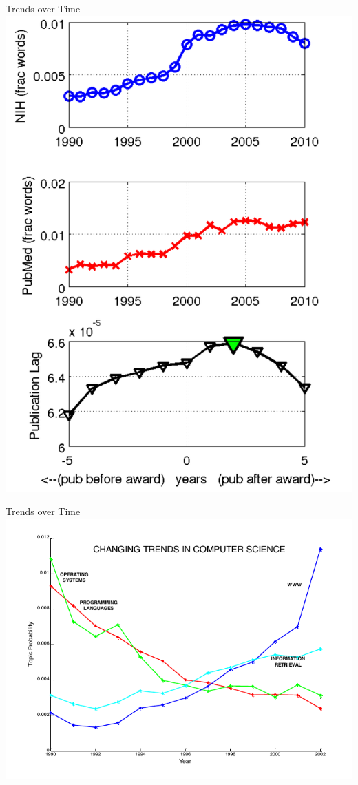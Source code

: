 \begin{frame}{Trends over Time}
  \centering
  \includegraphics[width=.5\linewidth]{topic_models/publication_lag}
\end{frame}

\begin{frame}{Trends over Time}
  \includegraphics[width=1.0\linewidth]{topic_models/cs_trends}
\end{frame}

